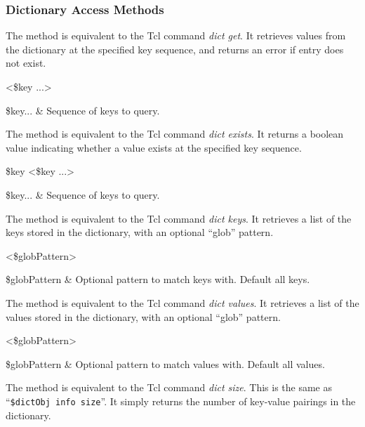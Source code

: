 \documentclass{article}
\begin{document}
\clearpage
\subsubsection{Dictionary Access Methods}

The method  is equivalent to the Tcl command \textit{dict get}. 
It retrieves values from the dictionary at the specified key sequence, and returns an error if entry does not exist.
\begin{syntax}
 <\$key ...>
\end{syntax}
\begin{args}
\$key... & Sequence of keys to query. 
\end{args}

The method  is equivalent to the Tcl command \textit{dict exists}.
It returns a boolean value indicating whether a value exists at the specified key sequence. 
\begin{syntax}
 \$key <\$key ...>
\end{syntax}
\begin{args}
\$key... & Sequence of keys to query. 
\end{args}

The method  is equivalent to the Tcl command \textit{dict keys}.
It retrieves a list of the keys stored in the dictionary, with an optional ``glob'' pattern.
\begin{syntax}
 <\$globPattern>
\end{syntax}
\begin{args}
\$globPattern & Optional pattern to match keys with. Default all keys.
\end{args}

The method  is equivalent to the Tcl command \textit{dict values}.
It retrieves a list of the values stored in the dictionary, with an optional ``glob'' pattern.
\begin{syntax}
 <\$globPattern>
\end{syntax}
\begin{args}
\$globPattern & Optional pattern to match values with. Default all values.
\end{args}

The method  is equivalent to the Tcl command \textit{dict size}. This is the same as ``\texttt{\$dictObj info size}''.
It simply returns the number of key-value pairings in the dictionary.
\begin{syntax}
\end{syntax}
\end{document}

